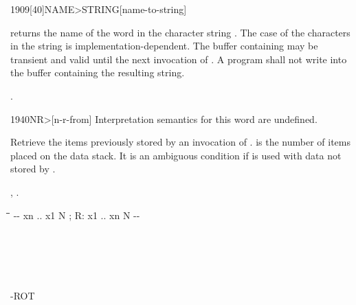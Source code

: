\begin{worddef}[NAMEtoSTRING]{1909}[40]{NAME>STRING}[name-to-string]%
\item {}

	 returns the name of the word 
	in the character string .  The case of the characters
	in the string is implementation-dependent.  The buffer containing
	 may be transient and valid until the next invocation
	of . A program shall not write into the buffer
	containing the resulting string.

\see {}.
\end{worddef}


\begin{worddef}[NRfrom]{1940}{NR>}[n-r-from]%
\interpret
	Interpretation semantics for this word are undefined.

\execute {} 

	Retrieve the items previously stored by an invocation of .
	 is the number of items placed on the data stack. It is an
	ambiguous condition if  is used with data not stored by
	. 

\see {}, .

	\begin{implement} %

		\begin{tabbing}
		\tab \= \tab \= \tab[11] \= \kill
		\word{:}   -{}- xn .. x1 N ; R: x1 .. xn N -{}- \\
		  \+ \\
			\word{Rfrom}     \\
			 \+ \\
				 \- \\
			 \+ \\
				\word{Rfrom}    -ROT \\
				 \- \\
			 \\
			 \- \\
		\word{;}
		\end{tabbing}
	\end{implement}
\end{worddef}

